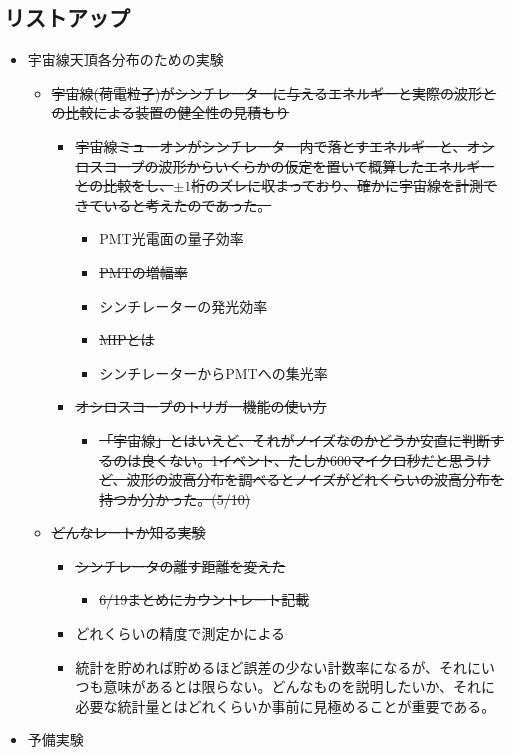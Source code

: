 \documentclass[a4paper,dvipdfmx,titlepage,oneside]{jsarticle}
\numberwithin{equation}{section}
\numberwithin{table}{section}
\numberwithin{figure}{section}
\begin{document}
	\subsection{リストアップ}
	\begin{itemize}
		\item 宇宙線天頂各分布のための実験
		\begin{itemize}
			\item \sout{宇宙線(荷電粒子)がシンチレーターに与えるエネルギーと実際の波形との比較による装置の健全性の見積もり}
			\begin{itemize}
				\item \sout{宇宙線ミューオンがシンチレーター内で落とすエネルギーと、オシロスコープの波形からいくらかの仮定を置いて概算したエネルギーとの比較をし、$\pm1$桁のズレに収まっており、確かに宇宙線を計測できていると考えたのであった。}
				\begin{itemize}
					\item PMT光電面の量子効率
					\item \sout{PMTの増幅率}
					\item シンチレーターの発光効率
					\item \sout{MIPとは}
					\item シンチレーターからPMTへの集光率
				\end{itemize}
				\item \sout{オシロスコープのトリガー機能の使い方}
				\begin{itemize}
					\item \sout{「宇宙線」とはいえど、それがノイズなのかどうか安直に判断するのは良くない。1イベント、たしか600マイクロ秒だと思うけど、波形の波高分布を調べるとノイズがどれくらいの波高分布を持つか分かった。(5/10)}
				\end{itemize}
			\end{itemize}
			\item \sout{どんなレートか知る実験}
			\begin{itemize}
				\item \sout{シンチレータの離す距離を変えた}
				\begin{itemize}
					\item \sout{6/19まとめにカウントレート記載}
				\end{itemize}
				\item どれくらいの精度で測定かによる
				\item 統計を貯めれば貯めるほど誤差の少ない計数率になるが、それにいつも意味があるとは限らない。どんなものを説明したいか、それに必要な統計量とはどれくらいか事前に見極めることが重要である。
			\end{itemize}
		\end{itemize}
		\item 予備実験
	\end{itemize}

	\newpage
	
	
	
	
	
	
	
	
	
	
	
\end{document}
